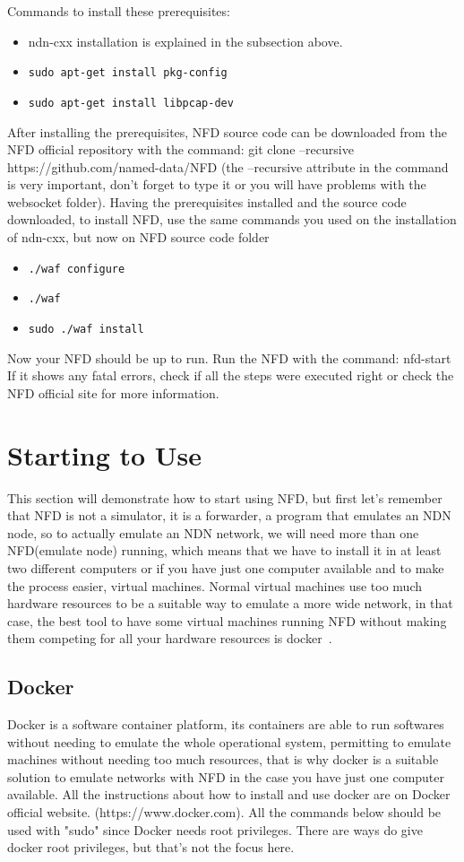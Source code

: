 \documentclass[10pt,letterpaper,extrafontsizes]{memoir}
\begin{document}
	Commands to install these prerequisites:
	\begin{itemize}
		\item ndn-cxx installation is explained in the subsection above.
		
		\item \texttt{sudo apt-get install pkg-config}
		
		\item \texttt{sudo apt-get install libpcap-dev}
	\end{itemize}
After installing the prerequisites, NFD source code can be downloaded from the NFD official repository with the command: git clone --recursive https://github.com/named-data/NFD (the --recursive attribute in the command is very important, don't forget to type it or you will have problems with the websocket folder).
Having the prerequisites installed and the source code downloaded, to install NFD, use the same commands you used on the installation of ndn-cxx, but now on NFD source code folder
\begin{itemize}
 \item \texttt{./waf configure} 
 \item \texttt{./waf}
 \item \texttt{sudo ./waf install}
\end{itemize}
Now your NFD should be up to run. Run the NFD with the command: nfd-start
If it shows any fatal errors, check if all the steps were executed right or check the NFD official site for more information.
\chapter{Starting to Use}
This section will demonstrate how to start using NFD, but first let's remember that NFD is not a simulator, it is a forwarder, a program that emulates an NDN node, so to actually emulate an NDN network, we will need more than one NFD(emulate node) running, which means that we have to install it in at least two different computers or if you have just one computer available and to make the process easier, virtual machines.
Normal virtual machines use too much hardware resources to be a suitable way to emulate a more wide network, in that case, the best tool to have some virtual machines running NFD without making them competing for all your hardware resources is docker~\cite{docker}. 

\section{Docker}
Docker is a software container platform, its containers are able to run softwares without needing to emulate the whole operational system, permitting to emulate machines without needing too much resources, that is why docker is a suitable solution to emulate networks with NFD in the case you have just one computer available.
All the instructions about how to install and use docker are on Docker official website. (https://www.docker.com).
All the commands below should be used with "sudo" since Docker needs root privileges. There are ways do give docker root privileges, but that's not the focus here.
\end{document}
